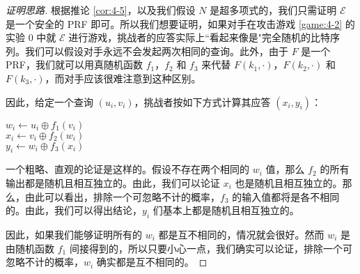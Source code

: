 \begin{proof}[证明思路]
根据推论 \ref{cor:4-5}，以及我们假设 $N$ 是超多项式的，我们只需证明 $\mathcal{E}$ 是一个安全的 PRF 即可。所以我们想要证明，如果对手在攻击游戏 \ref{game:4-2} 的实验 $0$ 中就 $\mathcal{E}$ 进行游戏，挑战者的应答实际上``看起来像是"完全随机的比特序列。我们可以假设对手永远不会发起两次相同的查询。此外，由于 $F$ 是一个 PRF，我们就可以用真随机函数 $f_1$，$f_2$ 和 $f_3$ 来代替 $F(k_1,\cdot)$，$F(k_2,\cdot)$ 和 $F(k_3,\cdot)$，而对手应该很难注意到这种区别。

因此，给定一个查询 $(u_i,v_i)$，挑战者按如下方式计算其应答 $(x_i,y_i)$：

\vspace{10pt}

\hspace*{5pt} $w_i\leftarrow u_i\oplus f_1(v_i)$\\
\hspace*{26pt} $x_i\leftarrow v_i\oplus f_2(w_i)$\\
\hspace*{26pt} $y_i\leftarrow w_i\oplus f_3(x_i)$

\vspace{10pt}

一个粗略、直观的论证是这样的。假设不存在两个相同的 $w_i$ 值，那么 $f_2$ 的所有输出都是随机且相互独立的。由此，我们可以论证 $x_i$ 也是随机且相互独立的。那么，由此可以看出，排除一个可忽略不计的概率，$f_3$ 的输入值都将是各不相同的。由此，我们可以得出结论，$y_i$ 们基本上都是随机且相互独立的。

因此，如果我们能够证明所有的 $w_i$ 都是互不相同的，情况就会很好。然而 $w_i$ 是由随机函数 $f_1$ 间接得到的，所以只要小心一点，我们确实可以论证，排除一个可忽略不计的概率，$w_i$ 确实都是互不相同的。
\end{proof}


